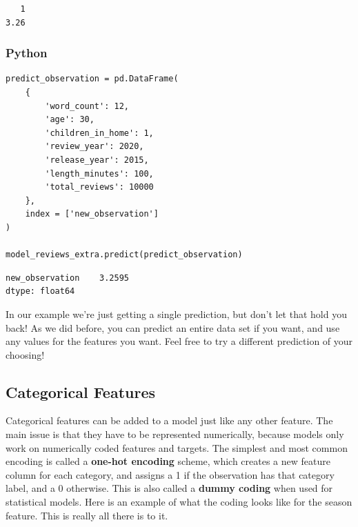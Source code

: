 \documentclass[
  letterpaper,
]{krantz}
\begin{document}
\begin{verbatim}
   1 
3.26 
\end{verbatim}

\subsubsection{Python}

\begin{verbatim}
predict_observation = pd.DataFrame(
    {
        'word_count': 12,
        'age': 30,
        'children_in_home': 1,
        'review_year': 2020,
        'release_year': 2015,
        'length_minutes': 100,
        'total_reviews': 10000
    },
    index = ['new_observation']
)

model_reviews_extra.predict(predict_observation)
\end{verbatim}

\begin{verbatim}
new_observation    3.2595
dtype: float64
\end{verbatim}

In our example we're just getting a single prediction, but don't let
that hold you back! As we did before, you can predict an entire data set
if you want, and use any values for the features you want. Feel free to
try a different prediction of your choosing!

\subsection{Categorical Features}\label{sec-lm-categorical-features}

Categorical features can be added to a model just like any other
feature. The main issue is that they have to be represented numerically,
because models only work on numerically coded features and targets. The
simplest and most common encoding is called a \textbf{one-hot encoding}
scheme, which creates a new feature column for each category, and
assigns a 1 if the observation has that category label, and a 0
otherwise. This is also called a \textbf{dummy coding} when used for
statistical models. Here is an example of what the coding looks like for
the season feature. This is really all there is to it.
\end{document}
